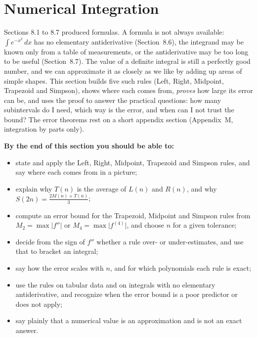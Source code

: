 \documentclass[11pt]{article}
\begin{document}
\section{Numerical Integration}

\begin{guide}
Sections 8.1 to 8.7 produced formulas. A formula is not always available: $\int e^{-x^2}\,dx$ has no elementary antiderivative (Section~8.6), the integrand may be known only from a table of measurements, or the antiderivative may be too long to be useful (Section~8.7). The value of a definite integral is still a perfectly good number, and we can approximate it as closely as we like by adding up areas of simple shapes. This section builds five such rules (Left, Right, Midpoint, Trapezoid and Simpson), shows where each comes from, \emph{proves} how large its error can be, and uses the proof to answer the practical questions: how many subintervals do I need, which way is the error, and when can I not trust the bound? The error theorems rest on a short appendix section (Appendix~M, integration by parts only).
\end{guide}

\textbf{By the end of this section you should be able to:}
\begin{itemize}
  \item state and apply the Left, Right, Midpoint, Trapezoid and Simpson rules, and say where each comes from in a picture;
  \item explain why $T(n)$ is the average of $L(n)$ and $R(n)$, and why $S(2n)=\frac{2M(n)+T(n)}3$;
  \item compute an error bound for the Trapezoid, Midpoint and Simpson rules from $M_2=\max\lvert f''\rvert$ or $M_4=\max\lvert f^{(4)}\rvert$, and choose $n$ for a given tolerance;
  \item decide from the sign of $f''$ whether a rule over- or under-estimates, and use that to bracket an integral;
  \item say how the error scales with $n$, and for which polynomials each rule is exact;
  \item use the rules on tabular data and on integrals with no elementary antiderivative, and recognize when the error bound is a poor predictor or does not apply;
  \item say plainly that a numerical value is an approximation and is not an exact answer.
\end{itemize}

\end{document}
